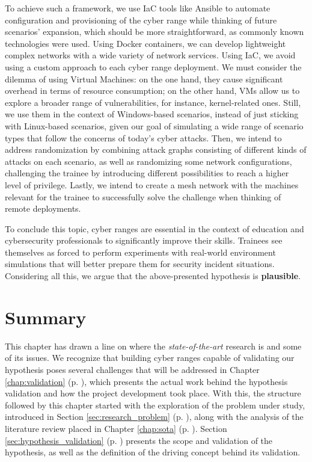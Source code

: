To achieve such a framework, we use IaC tools like Ansible to automate configuration and provisioning of the cyber range while thinking of future scenarios' expansion, which should be more straightforward, as commonly known technologies were used. Using Docker containers, we can develop lightweight complex networks with a wide variety of network services. Using IaC, we avoid using a custom approach to each cyber range deployment. We must consider the dilemma of using Virtual Machines: on the one hand, they cause significant overhead in terms of resource consumption; on the other hand, VMs allow us to explore a broader range of vulnerabilities, for instance, kernel-related ones. Still, we use them in the context of Windows-based scenarios, instead of just sticking with Linux-based scenarios, given our goal of simulating a wide range of scenario types that follow the concerns of today's cyber attacks. Then, we intend to address randomization by combining attack graphs consisting of different kinds of attacks on each scenario, as well as randomizing some network configurations, challenging the trainee by introducing different possibilities to reach a higher level of privilege. Lastly, we intend to create a mesh network with the machines relevant for the trainee to successfully solve the challenge when thinking of remote deployments.

To conclude this topic, cyber ranges are essential in the context of education and cybersecurity professionals to significantly improve their skills. Trainees see themselves as forced to perform experiments with real-world environment simulations that will better prepare them for security incident situations. Considering all this, we argue that the above-presented hypothesis is \textbf{plausible}.

\section{Summary} \label{sec:problem_summary}

This chapter has drawn a line on where the \textit{state-of-the-art} research is and some of its issues. We recognize that building cyber ranges capable of validating our hypothesis poses several challenges that will be addressed in Chapter \ref{chap:validation} (p. \pageref{chap:validation}), which presents the actual work behind the hypothesis validation and how the project development took place. With this, the structure followed by this chapter started with the exploration of the problem under study, introduced in Section \ref{sec:research_problem} (p. \pageref{sec:research_problem}), along with the analysis of the literature review placed in Chapter \ref{chap:sota} (p. \pageref{chap:sota}). Section \ref{sec:hypothesis_validation} (p. \pageref{sec:hypothesis_validation}) presents the scope and validation of the hypothesis, as well as the definition of the driving concept behind its validation.